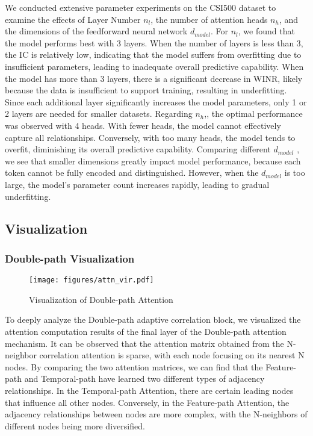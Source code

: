 We conducted extensive parameter experiments on the CSI500 dataset to examine the effects of Layer Number $n_l$, the number of attention heads $n_h$, and the dimensions of the feedforward neural network $d_{model}$. For $n_l$, we found that the model performs best with 3 layers. When the number of layers is less than 3, the IC is relatively low, indicating that the model suffers from overfitting due to insufficient parameters, leading to inadequate overall predictive capability. When the model has more than 3 layers, there is a significant decrease in WINR, likely because the data is insufficient to support training, resulting in underfitting. Since each additional layer significantly increases the model parameters, only 1 or 2 layers are needed for smaller datasets. Regarding $n_h$,, the optimal performance was observed with 4 heads. With fewer heads, the model cannot effectively capture all relationships. Conversely, with too many heads, the model tends to overfit, diminishing its overall predictive capability. Comparing different $d_{model}$ , we see that smaller dimensions greatly impact model performance, because each token cannot be fully encoded and distinguished. However, when the $d_{model}$ is too large, the model's parameter count increases rapidly, leading to gradual underfitting.
\subsection{Visualization}
\subsubsection{Double-path Visualization}
\begin{figure}[thbp]
    \centering
    \texttt{[image: figures/attn\_vir.pdf]}
    \caption[width=\textwidth]{Visualization of Double-path Attention}
    \label{fig:attn_vir}
\end{figure}
To deeply analyze the Double-path adaptive correlation block, we visualized the attention computation results of the final layer of the Double-path attention mechanism. It can be observed that the attention matrix obtained from the N-neighbor correlation attention is sparse, with each node focusing on its nearest N nodes. By comparing the two attention matrices, we can find that the Feature-path and Temporal-path have learned two different types of adjacency relationships. In the Temporal-path Attention, there are certain leading nodes that influence all other nodes. Conversely, in the Feature-path Attention, the adjacency relationships between nodes are more complex, with the N-neighbors of different nodes being more diversified.

